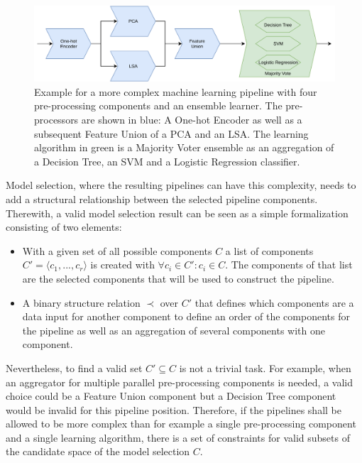 \begin{figure}[ht!]
    \centering
    \includegraphics[width=\textwidth]{gfx/Figures/Theory/ComplexPipeline.pdf}
    \caption[Example for a more complex machine learning pipeline.]{Example for a more complex machine learning pipeline with four pre-processing components and an ensemble learner. The pre-processors are shown in blue: A One-hot Encoder as well as a subsequent Feature Union of a PCA and an LSA. The learning algorithm in green is a Majority Voter ensemble as an aggregation of a Decision Tree, an SVM and a Logistic Regression classifier.}
	\label{fig:theory:complexPipeline}
\end{figure}

Model selection, where the resulting pipelines can have this complexity, needs to add a structural relationship between the selected pipeline components.
Therewith, a valid model selection result can be seen as a simple formalization consisting of two elements:
\begin{itemize}
    \item With a given set of all possible components $C$ a list of components $C' = \langle c_1, ..., c_r\rangle$ is created with $\forall c_i \in C' : c_i \in C$.
    The components of that list are the selected components that will be used to construct the pipeline.
    \item A binary structure relation $\prec$ over $C'$ that defines which components are a data input for another component to define an order of the components for the pipeline as well as an aggregation of several components with one component. 
\end{itemize}
Nevertheless, to find a valid set $C' \subseteq C$ is not a trivial task.
For example, when an aggregator for multiple parallel pre-processing components is needed, a valid choice could be a Feature Union component but a Decision Tree component would be invalid for this pipeline position.\newline
Therefore, if the pipelines shall be allowed to be more complex than for example a single pre-processing component and a single learning algorithm, there is a set of constraints for valid subsets of the candidate space of the model selection $C$.

